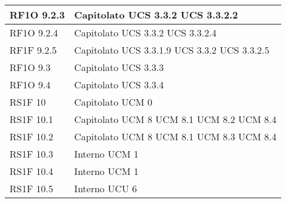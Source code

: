 \begin{center}
\begin{longtable}{ | p{5cm} | p{5cm} |}
				RF1O 9.2.3 &  Capitolato \newline  UCS 3.3.2 \newline  UCS 3.3.2.2 \newline  \\ \hline      
				RF1O 9.2.4 &  Capitolato \newline  UCS 3.3.2 \newline  UCS 3.3.2.4 \newline  \\ \hline      
				RF1F 9.2.5 &  Capitolato \newline  UCS 3.3.1.9 \newline  UCS 3.3.2 \newline  UCS 3.3.2.5 \newline  \\ \hline      
				RF1O 9.3 &  Capitolato \newline  UCS 3.3.3 \newline  \\ \hline      
				RF1O 9.4 &  Capitolato \newline  UCS 3.3.4 \newline  \\ \hline      
				RS1F 10 &  Capitolato \newline  UCM 0 \newline  \\ \hline      
				RS1F 10.1 &  Capitolato \newline  UCM 8 \newline  UCM 8.1 \newline  UCM 8.2 \newline  UCM 8.4 \newline  \\ \hline      
				RS1F 10.2 &  Capitolato \newline  UCM 8 \newline  UCM 8.1 \newline  UCM 8.3 \newline  UCM 8.4 \newline  \\ \hline      
				RS1F 10.3 &  Interno \newline  UCM 1 \newline  \\ \hline      
				RS1F 10.4 &  Interno \newline  UCM 1 \newline  \\ \hline      
				RS1F 10.5 &  Interno \newline  UCU 6 \newline  \\ \hline      

\end{longtable}
\end{center}
